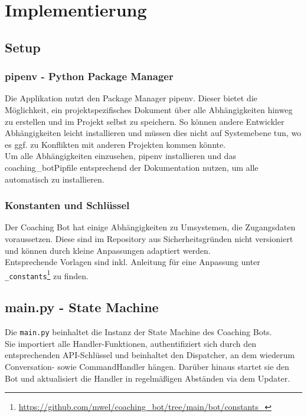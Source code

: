 \label{Implementierung}
\chapter{Implementierung}

    \section{Setup}

        \subsection{pipenv - Python Package Manager}
            Die Applikation nutzt den Package Manager pipenv. Dieser bietet die Möglichkeit, ein projektspezifisches Dokument über alle Abhängigkeiten hinweg zu erstellen und im Projekt selbst zu speichern. So können andere Entwickler Abhängigkeiten leicht installieren und müssen dies nicht auf Systemebene tun, wo es ggf. zu Konflikten mit anderen Projekten kommen könnte.\\
            Um alle Abhängigkeiten einzusehen, pipenv \cite{pipenv} installieren und das coaching\_bot\/Pipfile entsprechend der Dokumentation nutzen, um alle automatisch zu installieren.


        \subsection{Konstanten und Schlüssel}
            Der Coaching Bot hat einige Abhängigkeiten zu Umsystemen, die Zugangsdaten voraussetzen. Diese sind im Repository \cite{repo} aus Sicherheitsgründen nicht versioniert und können durch kleine Anpassungen adaptiert werden.\\ Entsprechende Vorlagen sind inkl. Anleitung für eine Anpassung unter \verb|_constants|\footnote{\url{https://github.com/mwel/coaching_bot/tree/main/bot/constants_}} zu finden.


    \section{main.py - State Machine}
        Die \verb|main.py| beinhaltet die Instanz der State Machine des Coaching Bots.\\
        Sie importiert alle Handler-Funktionen, authentifiziert sich durch den entsprechenden API-Schlüssel und beinhaltet den Dispatcher, an dem wiederum Conversation- sowie CommandHandler hängen. Darüber hinaus startet sie den Bot und aktualisiert die Handler in regelmäßigen Abständen via dem Updater.\\

